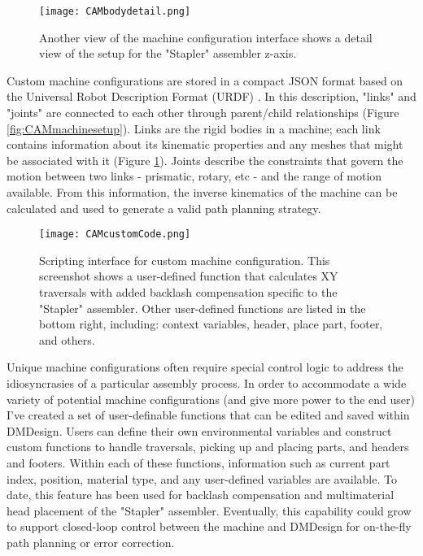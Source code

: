 {\begin{figure}
  \texttt{[image: CAMbodydetail.png]}
  \caption{Another view of the machine configuration interface shows a detail view of the setup for the "Stapler" assembler z-axis.}
  \label{fig:CAMbodydetail}
\end{figure}


Custom machine configurations are stored in a compact JSON format based on the Universal Robot Description Format (URDF) \cite{ROS2016}.  In this description, "links" and "joints" are connected to each other through parent/child relationships (Figure \ref{fig:CAMmachinesetup}).  Links are the rigid bodies in a machine; each link contains information about its kinematic properties and any meshes that might be associated with it (Figure \ref{fig:CAMbodydetail}).  Joints describe the constraints that govern the motion between two links - prismatic, rotary, etc - and the range of motion available.  From this information, the inverse kinematics of the machine can be calculated and used to generate a valid path planning strategy.\\

\begin{figure}
  \texttt{[image: CAMcustomCode.png]}
  \caption{Scripting interface for custom machine configuration.  This screenshot shows a user-defined function that calculates XY traversals with added backlash compensation specific to the "Stapler" assembler.  Other user-defined functions are listed in the bottom right, including: context variables, header, place part, footer, and others.}
  \label{fig:CAMcustomCode}
\end{figure}

Unique machine configurations often require special control logic to address the idiosyncrasies of a particular assembly process.  In order to accommodate a wide variety of potential machine configurations (and give more power to the end user) I've created a set of user-definable functions that can be edited and saved within DMDesign.  Users can define their own environmental variables and construct custom functions to handle traversals, picking up and placing parts, and headers and footers.  Within each of these functions, information such as current part index, position, material type, and any user-defined variables are available.  To date, this feature has been used for backlash compensation and multimaterial head placement of the "Stapler" assembler.  Eventually, this capability could grow to support closed-loop control between the machine and DMDesign for on-the-fly path planning or error correction.\\

}
